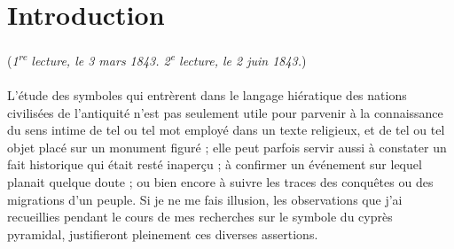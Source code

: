 \documentclass{article}
\begin{document}
\section*{Introduction}
\begin{center}
(\emph{1\textsuperscript{re} lecture, le 3 mars 1843. 2\textsuperscript{e} lecture, le 2 juin 1843.})
\end{center}
\paragraph{}
L'étude des symboles qui entrèrent dans le langage hiératique des nations civilisées de l'antiquité n'est pas seulement utile pour parvenir à la connaissance du sens intime de tel ou tel mot employé dans un texte religieux, et de tel ou tel objet placé sur un monument figuré ; elle peut parfois servir aussi à constater un fait historique qui était resté inaperçu ; à confirmer un événement sur lequel planait quelque doute ; ou bien encore à suivre les traces des conquêtes ou des migrations d'un peuple. Si je ne me fais illusion, les observations que j'ai recueillies pendant le cours de mes recherches sur le symbole du cyprès pyramidal, justifieront pleinement ces diverses assertions.
\end{document}
